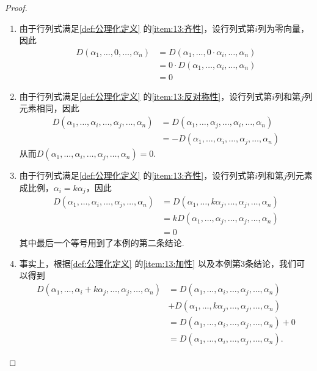 \begin{proof}
    \begin{enumerate}
        \item 由于行列式满足\autoref{def:公理化定义} 的\ref*{item:13:齐性}，设行列式第$i$列为零向量，因此
              \begin{align*}
                  D(\alpha_1,\ldots,0,\ldots,\alpha_n) & =D(\alpha_1,\ldots,0\cdot\alpha_i,\ldots,\alpha_n)  \\
                                                       & =0\cdot D(\alpha_1,\ldots,\alpha_i,\ldots,\alpha_n) \\
                                                       & =0
              \end{align*}

        \item 由于行列式满足\autoref{def:公理化定义} 的\ref*{item:13:反对称性}，设行列式第$i$列和第$j$列元素相同，因此
              \begin{align*}
                  D(\alpha_1,\ldots,\alpha_i,\ldots,\alpha_j,\ldots,\alpha_n) & =D(\alpha_1,\ldots,\alpha_j,\ldots,\alpha_i,\ldots,\alpha_n)  \\
                                                                              & =-D(\alpha_1,\ldots,\alpha_i,\ldots,\alpha_j,\ldots,\alpha_n)
              \end{align*}
              从而$D(\alpha_1,\ldots,\alpha_i,\ldots,\alpha_j,\ldots,\alpha_n)=0$.

        \item 由于行列式满足\autoref{def:公理化定义} 的\ref*{item:13:齐性}，设行列式第$i$列和第$j$列元素成比例，$\alpha_i=k\alpha_j$，因此
              \begin{align*}
                  D(\alpha_1,\ldots,\alpha_i,\ldots,\alpha_j,\ldots,\alpha_n)
                   & =D(\alpha_1,\ldots,k\alpha_j,\ldots,\alpha_j,\ldots,\alpha_n) \\
                   & =kD(\alpha_1,\ldots,\alpha_j,\ldots,\alpha_j,\ldots,\alpha_n) \\
                   & =0
              \end{align*}
              其中最后一个等号用到了本例的第二条结论.

        \item 事实上，根据\autoref{def:公理化定义} 的\ref*{item:13:加性} 以及本例第3条结论，我们可以得到
              \begin{align*}
                  D(\alpha_1,\ldots,\alpha_i+k\alpha_j,\ldots,\alpha_j,\ldots,\alpha_n)
                   & =D(\alpha_1,\ldots,\alpha_i,\ldots,\alpha_j,\ldots,\alpha_n)   \\&+D(\alpha_1,\ldots,k\alpha_j,\ldots,\alpha_j,\ldots,\alpha_n) \\
                   & =D(\alpha_1,\ldots,\alpha_i,\ldots,\alpha_j,\ldots,\alpha_n)+0 \\
                   & =D(\alpha_1,\ldots,\alpha_i,\ldots,\alpha_j,\ldots,\alpha_n).
              \end{align*}


\end{enumerate}
\end{proof}
